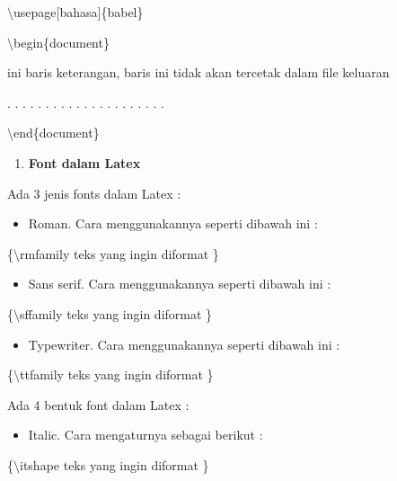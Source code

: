 $\setminus$usepage$[$bahasa$]$\{babel\}\par \vspace{12pt}

$\setminus$begin\{document\}\par \vspace{12pt}

ini baris keterangan, baris ini tidak akan tercetak dalam file 
keluaran

. . . . . . . . . . . . . . . . . . . . .\par \vspace{12pt}

$\setminus$end\{document\}

\begin{enumerate}
\setcounter{enumi}{\thenumberedCntB}
\item \textbf{Font dalam Latex}
\setcounter{numberedCntB}{\theenumi}
\end{enumerate}
Ada 3 jenis fonts dalam Latex :

\begin{itemize}
\item Roman. Cara menggunakannya seperti dibawah ini :
\end{itemize}
\hspace{0,5in}\{$\setminus$rmfamily teks yang ingin diformat \}

\begin{itemize}
\item Sans serif. Cara menggunakannya seperti dibawah ini :
\end{itemize}
\hspace{0,5in}\{$\setminus$sffamily teks yang ingin diformat \}

\begin{itemize}
\item Typewriter. Cara menggunakannya seperti dibawah ini :
\end{itemize}
\hspace{0,5in}\{$\setminus$ttfamily teks yang ingin diformat \}\par \vspace{12pt}



Ada 4 bentuk font dalam Latex :

\begin{itemize}
\item Italic. Cara mengaturnya sebagai berikut :
\end{itemize}
\hspace{0,5in}\{$\setminus$itshape teks yang ingin diformat \}

